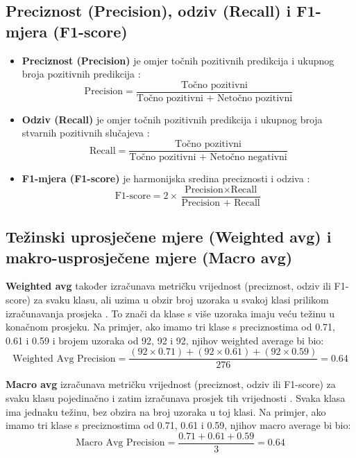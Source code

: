 \documentclass[zavrsnirad,upload]{fer}
\begin{document}
\subsection{Preciznost (Precision), odziv (Recall) i F1-mjera (F1-score)}

\begin{itemize}
	\item \textbf{Preciznost (Precision)} je omjer točnih pozitivnih predikcija i ukupnog broja pozitivnih predikcija \cite{medium_confusion_matrix}:
	\begin{equation}
		\text{Precision} = \frac{\text{Točno pozitivni}}{\text{Točno pozitivni + Netočno pozitivni}}
	\end{equation}
	\item \textbf{Odziv (Recall)} je omjer točnih pozitivnih predikcija i ukupnog broja stvarnih pozitivnih slučajeva \cite{medium_confusion_matrix}:
	\begin{equation}
		\text{Recall} = \frac{\text{Točno pozitivni}}{\text{Točno pozitivni + Netočno negativni}}
	\end{equation}
	\item \textbf{F1-mjera (F1-score)} je harmonijska sredina preciznosti i odziva \cite{towardsdatascience_confusion_matrix}:
	\begin{equation}
		\text{F1-score} = 2 \times \frac{\text{Precision} \times \text{Recall}}{\text{Precision + Recall}}
	\end{equation}
\end{itemize}


\subsection{Težinski uprosječene mjere (Weighted avg) i makro-usprosječene mjere (Macro avg)}

\textbf{Weighted avg} također izračunava metričku vrijednost (preciznost, odziv ili F1-score) za svaku klasu, ali uzima u obzir broj uzoraka u svakoj klasi prilikom izračunavanja prosjeka \cite{Mathew2023}. To znači da klase s više uzoraka imaju veću težinu u konačnom prosjeku. Na primjer, ako imamo tri klase s preciznostima od 0.71, 0.61 i 0.59 i brojem uzoraka od 92, 92 i 92, njihov weighted average bi bio:
\[ \text{Weighted Avg Precision} = \frac{(92 \times 0.71) + (92 \times 0.61) + (92 \times 0.59)}{276} = 0.64 \]

\textbf{Macro avg} izračunava metričku vrijednost (preciznost, odziv ili F1-score) za svaku klasu pojedinačno i zatim izračunava prosjek tih vrijednosti \cite{Mathew2023}. Svaka klasa ima jednaku težinu, bez obzira na broj uzoraka u toj klasi. Na primjer, ako imamo tri klase s preciznostima od 0.71, 0.61 i 0.59, njihov macro average bi bio:
\[ \text{Macro Avg Precision} = \frac{0.71 + 0.61 + 0.59}{3} = 0.64 \]
\end{document}
